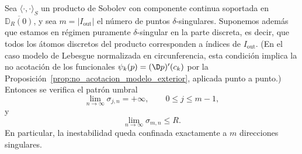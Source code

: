 \begin{thm}\label{thm:umbral_singular_indice_m_enunciado}
	Sea $\langle\cdot,\cdot\rangle_S$ un producto de Sobolev con componente continua soportada en
	$\overline{\mathbb D_R(0)}$, y sea $m=|I_{\mathrm{out}}|$ el número de puntos $\delta$-singulares.
	Suponemos además que estamos en régimen puramente $\delta$-singular en la parte discreta, es decir,
	que todos los átomos discretos del producto corresponden a índices de $I_{\mathrm{out}}$.
	(En el caso modelo de Lebesgue normalizada en circunferencia, esta condición implica la
	no acotación de los funcionales $\psi_k(p)=(\D p)'(c_k)$ por la
	Proposición~\ref{prop:no_acotacion_modelo_exterior}, aplicada punto a punto.)
	Entonces se verifica el patrón umbral
	\[
		\lim_{n\to\infty}\sigma_{j,n}=+\infty,
		\qquad 0\le j\le m-1,
	\]
	y
	\[
		\lim_{n\to\infty}\sigma_{m,n}\le R.
	\]
	En particular, la inestabilidad queda confinada exactamente a $m$ direcciones singulares.
\end{thm}

